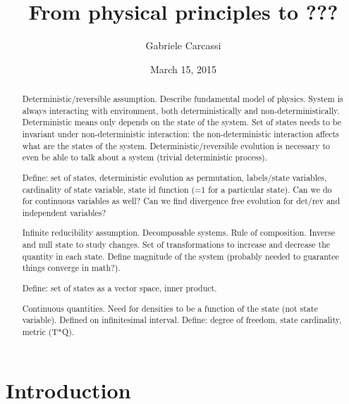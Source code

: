 \documentclass[aps,pra,10pt,twocolumn,floatfix,nofootinbib]{revtex4-1}
\theoremstyle{definition}
\begin{document}
\title{From physical principles to ???}
\author{Gabriele Carcassi}
\date{March 15, 2015}

\begin{abstract}
Deterministic/reversible assumption. Describe fundamental model of physics. System is always interacting with environment, both deterministically and non-deterministically. Deterministic means only depends on the state of the system. Set of states needs to be invariant under non-deterministic interaction: the non-deterministic interaction affects what are the states of the system. Deterministic/reversible evolution is necessary to even be able to talk about a system (trivial deterministic process).

Define: set of states, deterministic evolution as permutation, labels/state variables, cardinality of state variable, state id function (=1 for a particular state). Can we do for continuous variables as well? Can we find divergence free evolution for det/rev and independent variables?

Infinite reducibility assumption. Decomposable systems. Rule of composition. Inverse and null state to study changes. Set of transformations to increase and decrease the quantity in each state. Define magnitude of the system (probably needed to guarantee things converge in math?).

Define: set of states as a vector space, inner product.

Continuous quantities. Need for densities to be a function of the state (not state variable). Defined on infinitesimal interval. Define: degree of freedom, state cardinality, metric (T*Q).
\end{abstract}
\maketitle

\section{Introduction}
\end{document}
